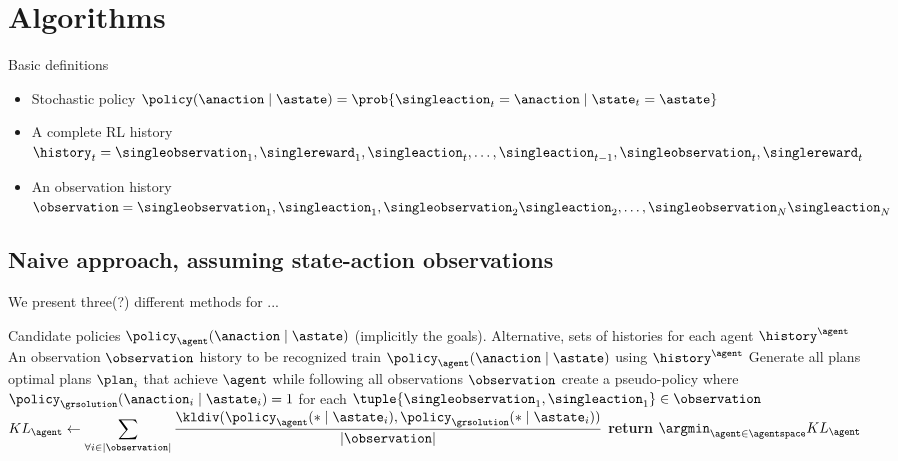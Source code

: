 \section*{Algorithms}


Basic definitions
\begin{itemize}
    \item Stochastic policy $\policy(\anaction \mid \astate) = \prob{\singleaction_{t} = \anaction \mid \state_{t} = \astate}$
    \item A complete RL history $\history_{t} = \singleobservation_{1}, \singlereward_{1}, \singleaction_{t}, \dots, \singleaction_{t-1}, \singleobservation_{t},\singlereward_{t}$
    \item An observation history $\observation = \singleobservation_{1}, \singleaction_{1}, \singleobservation_{2} \singleaction_{2}, \dots, \singleobservation_{N} \singleaction_{N}$
\end{itemize}

\subsection{Naive approach, assuming state-action observations}
\label{subsec:naiveGR}

We present three(?) different methods for ...


\begin{algorithmic}
    \Require Candidate policies $\policy_{\agent}(\anaction \mid \astate)$ (implicitly the goals). 
    \Require Alternative, sets of histories for each agent $\history^{\agent}$ 
    \Require An observation $\observation$ history to be recognized
    \State train $\policy_{\agent}(\anaction \mid \astate)$ using $\history^{\agent}$
    \ForAll{$\agent \in \agentspace$} 
        \State Generate all plans optimal plans $\plan_{i}$ that achieve $\agent$ while following all observations $\observation$
    \EndFor
    \State create a pseudo-policy where $\policy_{\grsolution}(\anaction_{i} \mid \astate_{i}) = 1$ for each $\tuple{\singleobservation_{1}, \singleaction_{1}} \in \observation$ 
    \ForAll{$\agent \in \agentspace$}
    \State $KL_{\agent} \gets \displaystyle\sum_{\forall{i} \in |\observation|} \frac{\kldiv(\policy_{\agent}(* \mid \astate_{i}),\policy_{\grsolution}(* \mid \astate_{i}))}{|\observation|}$ 
    \EndFor
    \State \textbf{return} $\displaystyle\argmin_{\agent \in \agentspace}KL_{\agent}$
    \EndFunction
\end{algorithmic}

